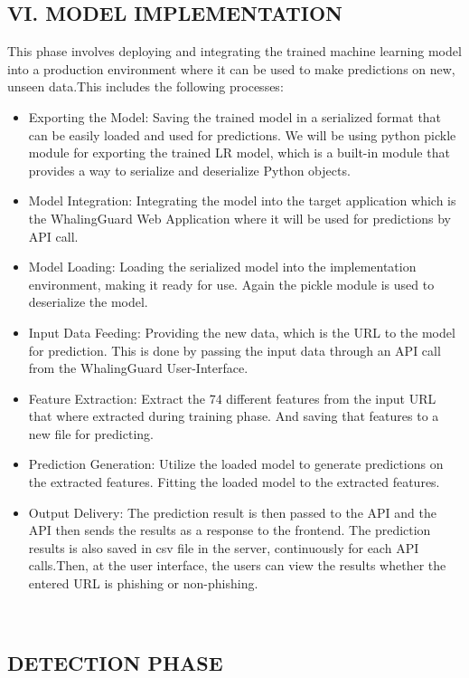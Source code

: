 \documentclass[conference]{IEEEtran}
\begin{document}
\subsection*{VI. {\footnotesize MODEL IMPLEMENTATION}}
\par This phase involves deploying and integrating the trained machine learning model into a production environment where it can be used to make predictions on new, unseen data.This includes the following processes:
\begin{itemize}
\item Exporting the Model: Saving the trained model in a serialized format that can be easily loaded and used for predictions. We will be using python pickle module for exporting the trained LR model, which is a built-in module that provides a way to serialize and deserialize Python objects.
\item Model Integration: Integrating the model into the target application which is the WhalingGuard Web Application where it will be used for predictions by API call.
\item Model Loading: Loading the serialized model into the implementation environment, making it ready for use. Again the pickle module is used to deserialize the model.
\item Input Data Feeding: Providing the new data, which is the URL to the model for prediction. This is done by passing the input data through an API call from the WhalingGuard User-Interface.
\item Feature Extraction: Extract the 74 different features from the input URL that where extracted during training phase. And saving that features to a new file for predicting.
\item Prediction Generation: Utilize the loaded model to generate predictions on the extracted features. Fitting the loaded model to the extracted features.  
\item Output Delivery: The prediction result is then passed to the API and the API then sends the results as a response to the frontend. The prediction results is also saved in csv file in the server, continuously for each API calls.Then, at the user interface, the users can view the results whether the entered URL is phishing or non-phishing.
\end{itemize}
\\
\subsection{DETECTION PHASE}
\end{document}
